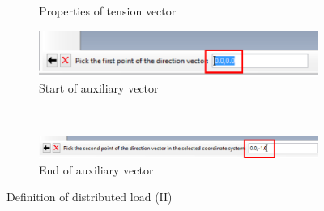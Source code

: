\begin{enumerate}
\begin{figure}[H]
\begin{varwidth}{0.40\linewidth}
\begin{subfigure}{0.95\textwidth}
      \caption{Properties of tension vector}
      \label{figu46}
    \end{subfigure}
  \end{varwidth}\quad%
  \begin{varwidth}{0.60\linewidth} %
    \begin{subfigure}{0.95\textwidth}
      \includegraphics[width=\textwidth]{./body/images/imagen47.pdf}
      \caption{Start of auxiliary vector}
      \label{figu47}
    \end{subfigure}
    \\
    \begin{subfigure}{0.95\textwidth}
      \includegraphics[width=\textwidth]{./body/images/imagen48.pdf}
      \caption{End of auxiliary vector}
      \label{figu48}
    \end{subfigure}
  \end{varwidth}
  \caption{Definition of distributed load (II)}
\end{figure}


\end{enumerate}
